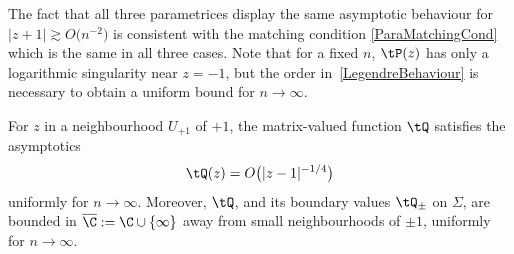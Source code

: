 The fact that all three parametrices display the same asymptotic behaviour for $|z+1|\gtrsim O\big(n^{-2}\big)$ is consistent with the matching condition \eqref{ParaMatchingCond} which is the same in all three cases. Note that for a fixed $n$, $\tP(z)$ has only a logarithmic singularity near $z = -1$, but the order in~\eqref{LegendreBehaviour} is necessary to obtain a uniform bound for $n\to\infty$.
\begin{Corollary}
For $z$ in a neighbourhood $U_{+1}$ of $+1$, the matrix-valued function $\tQ$ satisfies the asymptotics
\begin{align}\label{LegendreQBehaviour}
 \tQ(z) = O\big(|z-1|^{-1/4}\big)
\end{align}
uniformly for $n\to\infty$. Moreover, $\tQ$, and its boundary values $\tQ_\pm$ on $\Sigma$, are bounded in $\overline{\C} := \C \cup \lbrace \infty \rbrace$ away from small neighbourhoods of $\pm 1$, uniformly for $n\to\infty$.
\end{Corollary}

